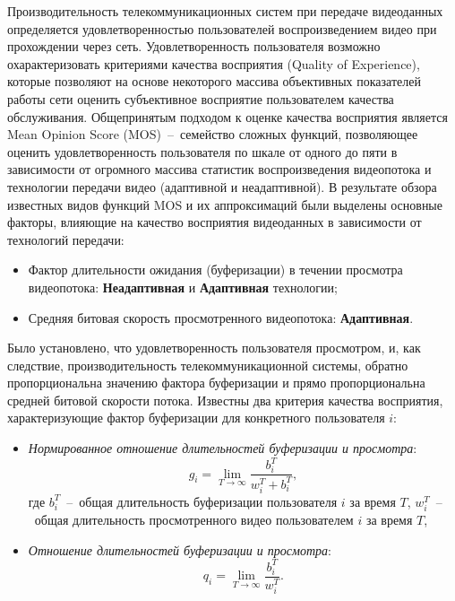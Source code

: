 Производительность телекоммуникационных систем при передаче видеоданных определяется удовлетворенностью пользователей воспроизведением видео при прохождении через сеть. Удовлетворенность пользователя возможно охарактеризовать критериями качества восприятия (Quality of Experience), которые позволяют на основе некоторого массива объективных показателей работы сети оценить субъективное восприятие пользователем качества обслуживания. Общепринятым подходом к оценке качества восприятия является Mean Opinion Score (MOS)~--~семейство сложных функций, позволяющее оценить удовлетворенность пользователя по шкале от одного до пяти в зависимости от огромного массива статистик воспроизведения видеопотока и технологии передачи видео (адаптивной и неадаптивной). В результате обзора известных видов функций MOS и их аппроксимаций были выделены основные факторы, влияющие на качество восприятия видеоданных в зависимости от технологий передачи:
\begin{itemize}
	\item Фактор длительности ожидания (буферизации) в течении просмотра видеопотока: \textbf{Неадаптивная} и \textbf{Адаптивная} технологии;
	\item Средняя битовая скорость просмотренного видеопотока: \textbf{Адаптивная}.
\end{itemize}
Было установлено, что удовлетворенность пользователя просмотром, и, как следствие, производительность телекоммуникационной системы, обратно пропорциональна значению фактора буферизации и прямо пропорциональна средней битовой скорости потока. Известны два критерия качества восприятия, характеризующие фактор буферизации для конкретного пользователя $i$:
\begin{itemize}
	\item \textit{Нормированное отношение длительностей буферизации и просмотра}:
	\begin{equation}
    	\label{eq:g_def}
    	g_i = \lim\limits_{T\rightarrow\infty} \frac{b_i^T}{w_i^T + b_i^T},
    \end{equation}
    где $b_i^T$~--~общая длительность буферизации пользователя $i$ за время $T$, $w_i^T$~--~общая длительность просмотренного видео пользователем $i$ за время $T$,
	\item \textit{Отношение длительностей буферизации и просмотра}:
	\begin{equation}
    	\label{eq:q_def}
    	q_i = \lim\limits_{T\rightarrow\infty} \frac{b_i^T}{w_i^T}.
    \end{equation}
\end{itemize}

